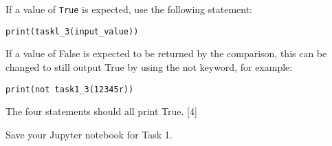 If a value of \texttt{True} is expected, use the following statement: 

\texttt{\qquad{}print(taskl\_3(input\_value)) }

If a value of False is expected to be returned by the comparison,
this can be changed to still output True by using the not keyword,
for example: 

\texttt{\qquad{}print(not task1\_3(\textquotedbl 12345r\textquotedbl )) }

The four statements should all print True. \hfill{}{[}4{]}

Save your Jupyter notebook for Task 1.